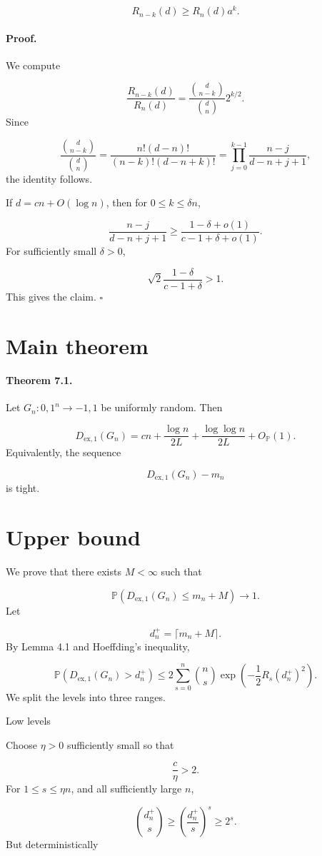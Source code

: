 \documentclass[11pt]{article}
\theoremstyle{definition}
\begin{document}
\[
R_{n-k}(d)\ge R_n(d)a^k.
\]
\paragraph{Proof.}
We compute

\[
\frac{R_{n-k}(d)}{R_n(d)}
=
\frac{\binom d{n-k}}{\binom dn}2^{k/2}.
\]
Since

\[
\frac{\binom d{n-k}}{\binom dn}
=
\frac{n!(d-n)!}{(n-k)!(d-n+k)!}
=
\prod_{j=0}^{k-1}
\frac{n-j}{d-n+j+1},
\]
the identity follows.

If $d=cn+O(\log n)$, then for $0\le k\le\delta n$,

\[
\frac{n-j}{d-n+j+1}
\ge
\frac{1-\delta+o(1)}{c-1+\delta+o(1)}.
\]
For sufficiently small $\delta>0$,

\[
\sqrt2\frac{1-\delta}{c-1+\delta}>1.
\]
This gives the claim. $\square$

\section{Main theorem}
\paragraph{Theorem 7.1.}
Let $G_n:{0,1}^n\to{-1,1}$ be uniformly random. Then

\[
D_{\mathrm{ex},1}(G_n)
=
cn+
\frac{\log n}{2L}
+
\frac{\log\log n}{2L}
+
O_{\mathbb{P}}(1).
\]
Equivalently, the sequence

\[
D_{\mathrm{ex},1}(G_n)-m_n
\]
is tight.

\section{Upper bound}
We prove that there exists $M<\infty$ such that

\[
\mathbb{P}\left(
D_{\mathrm{ex},1}(G_n)\le m_n+M
\right)\to1.
\]
Let

\[
d_n^+=\lceil m_n+M\rceil.
\]
By Lemma 4.1 and Hoeffding's inequality,

\[
\mathbb{P}\left(
D_{\mathrm{ex},1}(G_n)>d_n^+
\right)
\le
2\sum_{s=0}^n
\binom ns
\exp\left(
-\frac12R_s(d_n^+)^2
\right).
\]
We split the levels into three ranges.

Low levels

Choose $\eta>0$ sufficiently small so that

\[
\frac c\eta>2.
\]
For $1\le s\le\eta n$, and all sufficiently large $n$,

\[
\binom{d_n^+}{s}
\ge
\left(\frac{d_n^+}{s}\right)^s
\ge
2^s.
\]
But deterministically
\end{document}
